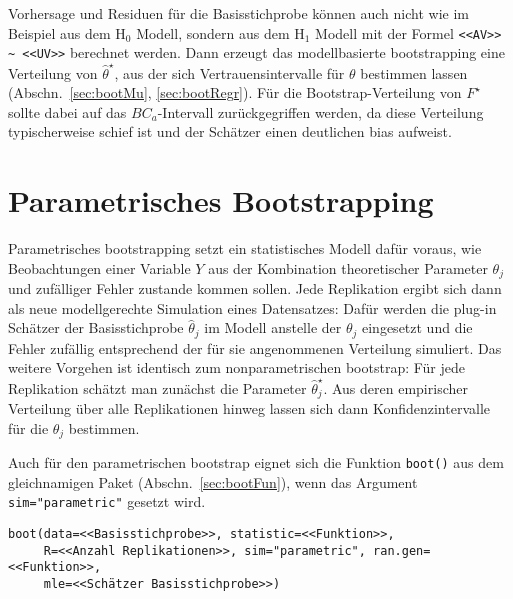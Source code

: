 Vorhersage und Residuen für die Basisstichprobe können auch nicht wie im Beispiel aus dem $\text{H}_{0}$ Modell, sondern aus dem $\text{H}_{1}$ Modell mit der Formel \lstinline!<<AV>> ~ <<UV>>! berechnet werden. Dann erzeugt das modellbasierte bootstrapping eine Verteilung von $\hat{\theta}^{\star}$, aus der sich Vertrauensintervalle für $\theta$ bestimmen lassen (Abschn.\ \ref{sec:bootMu}, \ref{sec:bootRegr}). Für die Bootstrap-Verteilung von $F^{\star}$ sollte dabei auf das $BC_{a}$-Intervall zurückgegriffen werden, da diese Verteilung typischerweise schief ist und der Schätzer einen deutlichen bias aufweist.

\section{Parametrisches Bootstrapping}
\label{sec:bootParam}

Parametrisches bootstrapping setzt ein statistisches Modell dafür voraus, wie Beobachtungen einer Variable $Y$ aus der Kombination theoretischer Parameter $\theta_{j}$ und zufälliger Fehler zustande kommen sollen. Jede Replikation ergibt sich dann als neue modellgerechte Simulation eines Datensatzes: Dafür werden die plug-in Schätzer der Basisstichprobe $\hat{\theta}_{j}$ im Modell anstelle der $\theta_{j}$ eingesetzt und die Fehler zufällig entsprechend der für sie angenommenen Verteilung simuliert. Das weitere Vorgehen ist identisch zum nonparametrischen bootstrap: Für jede Replikation schätzt man zunächst die Parameter $\hat{\theta}_{j}^{\star}$. Aus deren empirischer Verteilung über alle Replikationen hinweg lassen sich dann Konfidenzintervalle für die $\theta_{j}$ bestimmen.

Auch für den parametrischen bootstrap eignet sich die Funktion \lstinline!boot()! aus dem gleichnamigen Paket (Abschn.\ \ref{sec:bootFun}), wenn das Argument \lstinline!sim="parametric"! gesetzt wird.
\begin{lstlisting}
boot(data=<<Basisstichprobe>>, statistic=<<Funktion>>,
     R=<<Anzahl Replikationen>>, sim="parametric", ran.gen=<<Funktion>>,
     mle=<<Schätzer Basisstichprobe>>)
\end{lstlisting}

